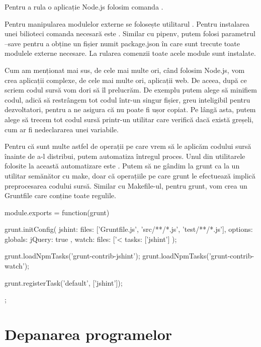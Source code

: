 Pentru a rula o aplicație Node.js folosim comanda .

Pentru manipularea modulelor externe se folosește utilitarul . Pentru
instalarea unei bilioteci comanda necesară este .
Similar cu pipenv, putem folosi parametrul --save pentru a obține un fișier
numit package.json în care sunt trecute toate modulele externe necesare. La
rularea comenzii  toate acele module sunt instalate.

Cum am menționat mai sus, de cele mai multe ori, când folosim Node.js, vom crea
aplicații complexe, de cele mai multe ori, aplicații web. De aceea, după ce
scriem codul sursă vom dori să îl prelucrăm. De exemplu putem alege să minifiem
codul, adică să restrângem tot codul într-un singur fișier, greu inteligibil
pentru dezvoltatori, pentru a ne asigura că nu poate fi ușor copiat. Pe lângă
asta, putem alege să trecem tot codul sursă printr-un utilitar care verifică
dacă există greșeli, cum ar fi nedeclararea unei variabile.

Pentru că sunt multe astfel de operații pe care vrem să le aplicăm codului sursă
înainte de a-l distribui, putem automatiza întregul proces. Unul din utilitarele
folosite la această automatizare este . Putem să ne gândim la grunt
ca la un utilitar semănător cu make, doar că operațiile pe care grunt le
efectuează implică preprocesarea codului sursă. Similar cu Makefile-ul, pentru
grunt, vom crea un Gruntfile care conține toate regulile.

\begin{screen}
module.exports = function(grunt) {

 grunt.initConfig({
   jshint: {
     files: ['Gruntfile.js', 'src/**/*.js', 'test/**/*.js'],
     options: {
       globals: {
         jQuery: true
       }
     }
   },
   watch: {
     files: ['<%
     tasks: ['jshint']
   }
 });

 grunt.loadNpmTasks('grunt-contrib-jshint');
 grunt.loadNpmTasks('grunt-contrib-watch');

 grunt.registerTask('default', ['jshint']);

};
\end{screen}

\section{Depanarea programelor}
\label{sec:appdev-debugging}


